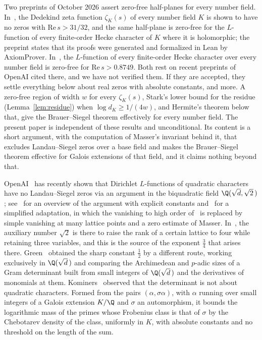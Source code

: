 \documentclass[11pt, reqno, twoside, letterpaper]{amsart}
\newcommand{\Kf}{K}
\begin{document}
Two preprints of October 2026 assert zero-free half-planes for every
number field. In~\cite{CT}, the Dedekind zeta function $\zeta_\Kf(s)$
of every number field $\Kf$ is shown to have no zeros with
$\mathrm{Re}\,s>31/32$, and the same half-plane is zero-free for the
$L$-function of every finite-order Hecke character of $\Kf$ where it
is holomorphic; the preprint states that its proofs were generated
and formalized in Lean by AxiomProver. In~\cite{Li}, the $L$-function
of every finite-order Hecke character over every number field is
zero-free for $\mathrm{Re}\,s>0.8749$. Both rest on recent preprints
of OpenAI cited there, and we have not verified them. If they are
accepted, they settle everything below about real zeros with
absolute constants, and more. A zero-free region of width $w$ for
every $\zeta_\Kf(s)$, Stark's lower bound for the residue
(Lemma~\ref{lem:residue}) when $\log d_\Kf\ge 1/(4w)$, and Hermite's
theorem below that, give the Brauer--Siegel theorem effectively for
every number field. The present paper is independent of these
results and unconditional. Its content is a short argument, with
the computation of Masser's invariant behind it, that excludes
Landau--Siegel zeros over a base field and makes the Brauer--Siegel
theorem effective for Galois extensions of that field, and it
claims nothing beyond that.

OpenAI~\cite{OAI} has recently shown that Dirichlet $L$-functions of
quadratic characters have no Landau--Siegel zeros via an argument in
the biquadratic field $\Q(\sqrt d,\sqrt 2\,)$; see~\cite{Ba} for an
overview of the argument with explicit constants and~\cite{Ke} for a
simplified adaptation, in which the vanishing to high order
of~\cite{OAI} is replaced by simple vanishing at many lattice points
and a zero estimate of Masser. In~\cite{Ke}, the auxiliary number
$\sqrt 2$ is there to raise the rank of a certain lattice to four
while retaining three variables, and this is the source of the
exponent $\tfrac34$ that arises there. Green~\cite{Gr} obtained the
sharp constant $\tfrac12$ by a different route, working exclusively
in $\Q(\sqrt d\,)$ and comparing the Archimedean and $p$-adic sizes
of a Gram determinant built from small integers of $\Q(\sqrt d\,)$
and the derivatives of monomials at them.
Kominers~\cite{Ko} observed that the determinant is not about
quadratic characters. Formed from the pairs $(\alpha,\sigma\alpha)$,
with $\alpha$ running over small integers of a Galois extension
$\Kf/\Q$ and $\sigma$ an automorphism, it bounds the logarithmic
mass of the primes whose Frobenius class is that of $\sigma$ by the
Chebotarev density of the class, uniformly in $\Kf$, with absolute
constants and no threshold on the length of the sum.
\end{document}
